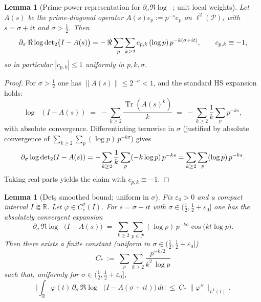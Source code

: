 \documentclass[11pt]{article}
\newtheorem{lemma}[theorem]{Lemma}
\theoremstyle{definition}
\theoremstyle{remark}
\newcommand{\R}{\mathbb{R}}
\newcommand{\PP}{\mathcal{P}}
\DeclareMathOperator{\Tr}{Tr}
\DeclareMathOperator{\dettwo}{det_2}
\begin{document}
\begin{lemma}[Prime-power representation for \(\partial_\sigma\Re\log\dettwo\); unit local weights]\label{lem:pp-rep-det2}
Let \(A(s)\) be the prime-diagonal operator \(A(s)e_p:=p^{-s}e_p\) on \(\ell^2(\PP)\), with \(s=\sigma+it\) and \(\sigma>\tfrac12\). Then
\[
  \partial_\sigma\,\Re\log\dettwo\!\big(I-A(s)\big)
  \\= -\,\Re\sum_{p}\sum_{k\ge 2} c_{p,k}\,(\log p)\,p^{-k(\sigma+it)},\qquad c_{p,k}\equiv -1,
\]
so in particular \(|c_{p,k}|\le 1\) uniformly in \(p,k,\sigma\).
\end{lemma}
\begin{proof}
For \(\sigma>\tfrac12\) one has \(\|A(s)\|\le 2^{-\sigma}<1\), and the standard HS expansion holds:
\[
  \log\dettwo(I-A(s))\;=\;-\sum_{k\ge 2} \frac{\Tr(A(s)^k)}{k}\;=\;-\sum_{k\ge 2}\frac1k\sum_{p}p^{-ks},
\]
with absolute convergence. Differentiating termwise in \(\sigma\) (justified by absolute convergence of \(\sum_{k\ge 2}\sum_p (\log p)\,p^{-k\sigma}\)) gives
\[
  \partial_\sigma \log\dettwo(I-A(s))
  \\= -\sum_{k\ge 2}\frac1k\sum_p (-k\log p)\,p^{-ks}
  \\=\sum_{k\ge 2}\sum_p (\log p)\,p^{-ks}.
\]
Taking real parts yields the claim with \(c_{p,k}\equiv -1\).
\end{proof}
\begin{lemma}[Det$_2$ smoothed bound; uniform in \(\sigma\)]\label{lem:det2-smoothed-target}
Fix \(\varepsilon_0>0\) and a compact interval \(I\Subset\R\). Let \(\varphi\in C_c^2(I)\). For \(s=\sigma+it\) with \(\sigma\in(\tfrac12,\tfrac12+\varepsilon_0]\) one has the absolutely convergent expansion
\[
 \partial_\sigma\,\Re\log\dettwo\big(I-A(s)\big)
 \;=\; \sum_{k\ge 2}\sum_{p\in\PP} (\log p)\,p^{-k\sigma}\cos\big(k t\log p\big).
\]
Then there exists a finite constant (uniform in \(\sigma\in(\tfrac12,\tfrac12+\varepsilon_0]\))
\[
 C_*\ :=\ \sum_{p}\sum_{k\ge 2}\frac{p^{-k/2}}{k^2\,\log p}
\]
such that, uniformly for \(\sigma\in(\tfrac12,\tfrac12+\varepsilon_0]\),
\[
 \Big|\int_{\R} \varphi(t)\,\partial_\sigma\,\Re\log\dettwo\big(I-A(\sigma+it)\big)\,dt\Big|
 \ \le\ C_*\,\|\varphi''\|_{L^1(I)}.
\]
\end{lemma}
\end{document}
